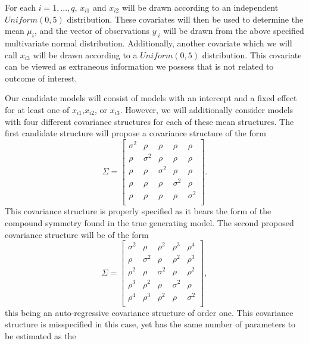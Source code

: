 		For each $i = 1,...,q$, $x_{i1}$ and $x_{i2}$ will be drawn according to an independent $Uniform(0,5)$ distribution. These covariates will then be used to determine the mean
		$\mu_i$, and the vector of observations $y_{\cdot i}$ will be drawn from the above specified multivariate normal distribution. Additionally, another covariate which we will
		call $x_{i3}$ will be drawn according to a $Uniform(0,5)$ distribution. This covariate can be viewed as extraneous information we possess that is not related to outcome of
		interest. 

		Our candidate models will consist of models with an intercept and a fixed effect for at least one of $x_{i1}$,$x_{i2}$, or $x_{i3}$. However, we will additionally consider models
		with four different covariance structures for each of these mean structures. The first candidate structure will propose a covariance structure of the form
		\begin{equation}
			\Sigma = 
			\begin{bmatrix}
				\sigma^2 & \rho & \rho & \rho & \rho \\
				\rho & \sigma^2 & \rho & \rho & \rho \\
				\rho & \rho & \sigma^2 & \rho & \rho \\
				\rho & \rho & \rho & \sigma^2 & \rho \\
				\rho & \rho & \rho & \rho & \sigma^2 \\
			\end{bmatrix}
			.
		\end{equation}
		This covariance structure is properly specified as it bears the form of the compound symmetry found in the true generating model. The second proposed covariance structure will be
		of the form
		\begin{equation}
			\Sigma = 
			\begin{bmatrix}
				\sigma^2 & \rho & \rho^2 & \rho^3 & \rho^4 \\
				\rho & \sigma^2 & \rho & \rho^2 & \rho^3 \\
				\rho^2 & \rho & \sigma^2 & \rho & \rho^2 \\
				\rho^3 & \rho^2 & \rho & \sigma^2 & \rho \\
				\rho^4 & \rho^3 & \rho^2 & \rho & \sigma^2 \\
			\end{bmatrix}
			,
		\end{equation}
		this being an auto-regressive covariance structure of order one. This covariance structure is misspecified in this case, yet has the same number of parameters to be estimated as the
